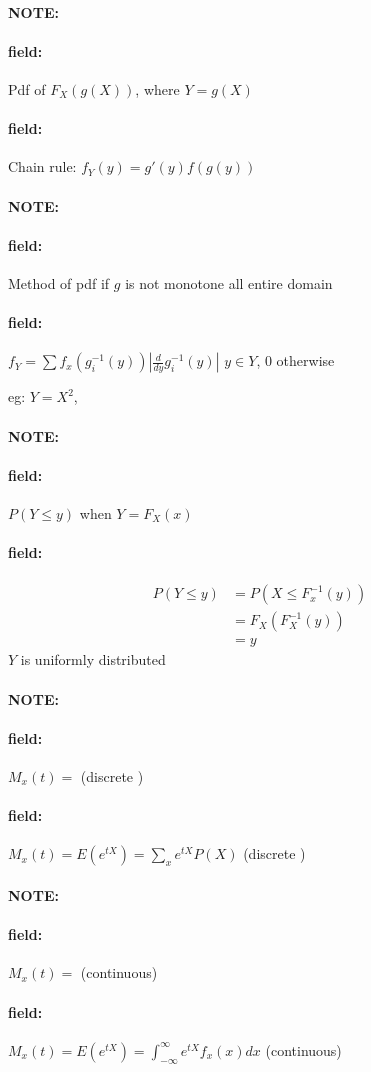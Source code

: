 \documentclass[12pt]{article}
\newenvironment{note}{\paragraph{NOTE:}}{}
\newenvironment{field}{\paragraph{field:}}{}
\begin{document}
\begin{note}
  \begin{field}
    Pdf of $F_X(g(X))$, where $Y = g(X)$
  \end{field}
  \begin{field}
    Chain rule:
    $f_Y(y) = g'(y)f(g(y))$
  \end{field}
\end{note}

\begin{note}
  \begin{field}
    Method of pdf if $g$ is not monotone all entire domain
  \end{field}
  \begin{field}
    $f_Y = \sum f_x(g_i^{-1}(y))|\frac{d}{dy}g_i^{-1}(y)|$ $y \in Y$, 0 otherwise

    eg: $Y = X^2$,
  \end{field}
\end{note}

\begin{note}
  \begin{field}
    $P(Y  \leq y)$ when $Y = F_X(x)$
  \end{field}
  \begin{field}
    \begin{align*}
      P(Y \leq y) &= P(X \leq F_x^{-1}(y))\\
      &= F_X(F_X^{-1}(y))\\
      &= y
    \end{align*}
    $Y$ is uniformly distributed
  \end{field}
\end{note}

\begin{note}
  \begin{field}
    $M_x(t) = $ (discrete )
  \end{field}
  \begin{field}
    $M_x(t) = E(e^{tX}) = \sum_x e^{tX}P(X)$ (discrete )
  \end{field}
\end{note}

\begin{note}
  \begin{field}
    $M_x(t) = $ (continuous)
  \end{field}
  \begin{field}
    $M_x(t) = E(e^{tX}) = \int_{-\infty}^\infty e^{tX}f_x(x)dx$ (continuous)
  \end{field}
\end{note}
\end{document}
